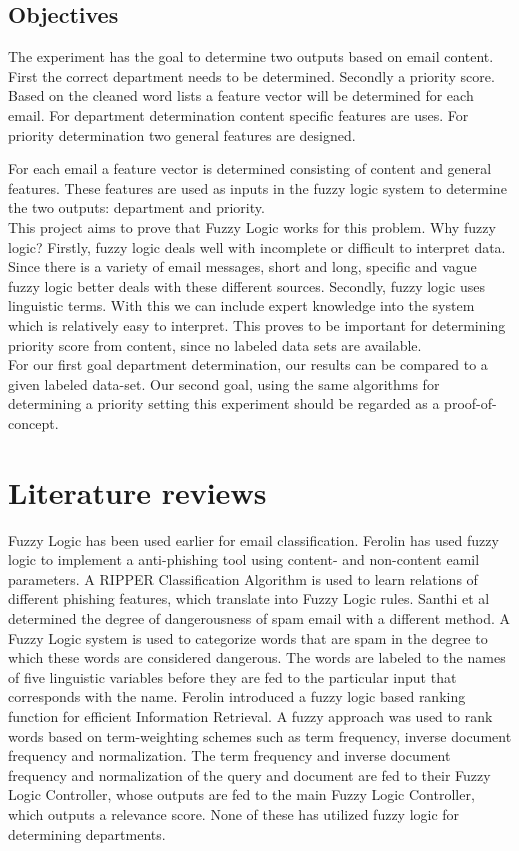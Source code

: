 \documentclass[journal]{IEEEtran}
\begin{document}
\subsection{Objectives}

The experiment has the goal to determine two outputs based on email content. First the correct department needs to be determined. Secondly a priority score. Based on the cleaned word lists a feature vector will be determined for each email. For department determination content specific features are uses. For priority determination two general features are designed. 

For each email a feature vector is determined consisting of content and general features. These features are used as inputs in the fuzzy logic system to determine the two outputs: department and priority. \\

This project aims to prove that Fuzzy Logic works for this problem. Why fuzzy logic? Firstly, fuzzy logic deals well with incomplete or difficult to interpret data. Since there is a variety of email messages, short and long, specific and vague fuzzy logic better deals with these different sources. Secondly, fuzzy logic uses linguistic terms. With this we can include expert knowledge into the system which is relatively easy to interpret. This proves to be important for determining priority score from content, since no labeled data sets are available.\\

For our first goal department determination, our results can be compared to a given labeled data-set. Our second goal, using the same algorithms for determining a priority setting this experiment should be regarded as a proof-of-concept.  

\section{Literature reviews}

Fuzzy Logic has been used earlier for email classification. Ferolin \cite{phishing} 
has used fuzzy logic to implement a anti-phishing tool using content- and non-content eamil parameters. A RIPPER Classification Algorithm is used to learn relations of different phishing features, which translate into Fuzzy Logic rules. Santhi et al \cite{spam} determined the degree of dangerousness of spam email with a different method. A Fuzzy Logic system is used to categorize words that are spam in the degree to which these words are considered dangerous. The words are labeled to the names of five linguistic variables before they are fed to the particular input that corresponds with the name. Ferolin \cite{ranking} introduced a fuzzy logic based ranking function for efficient Information Retrieval. A fuzzy approach was used to rank words based on term-weighting schemes such as term frequency, inverse document frequency and normalization. The term frequency and inverse document frequency and normalization of the query and document are fed to their Fuzzy Logic Controller, whose outputs are fed to the main Fuzzy Logic Controller, which outputs a relevance score. None of these has utilized fuzzy logic for determining departments. 
\end{document}
